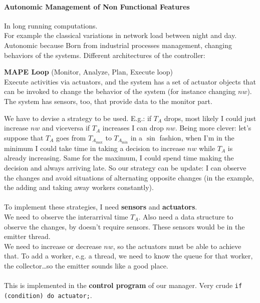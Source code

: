 \documentclass[10pt]{report}
\begin{document}
\paragraph{Autonomic Management of Non Functional Features} In long running computations.\\
For example the classical variations in network load between night and day. Autonomic because %
Born from industrial processes management, changing behaviors of the systems. Different architectures of the controller:
\begin{list}{}{}
	\item \textbf{MAPE Loop} (Monitor, Analyze, Plan, Execute loop)\\
	Execute activities via actuators, and the system has a set of actuator objects that can be invoked to change the behavior of the system (for instance changing $nw$). The system has sensors, too, that provide data to the monitor part.
\end{list}
We have to devise a strategy to be used. E.g.: if $T_A$ drops, most likely I could just increase $nw$ and viceversa if $T_A$ increases I can drop $nw$. Being more clever: let's suppose that $T_A$ goes from $T_{A_{\max}}$ to $T_{A_{\min}}$ in a $\sin$ fashion, when I'm in the minimum I could take time in taking a decision to increase $nw$ while $T_A$ is already increasing. Same for the maximum, I could spend time making the decision and always arriving late. So our strategy can be update: I can observe the changes and avoid situations of alternating opposite changes (in the example, the adding and taking away workers constantly).\\\\
To implement these strategies, I need \textbf{sensors} and \textbf{actuators}.\\
We need to observe the interarrival time $T_A$. Also need a data structure to observe the changes, by doesn't require sensors. These sensors would be in the emitter thread.\\
We need to increase or decrease $nw$, so the actuators must be able to achieve that. To add a worker, e.g. a thread, we need to know the queue for that worker, the collector\ldots so the emitter sounds like a good place.\\\\
This is implemented in the \textbf{control program} of our manager. Very crude \texttt{if (condition) do actuator;}.
\end{document}
